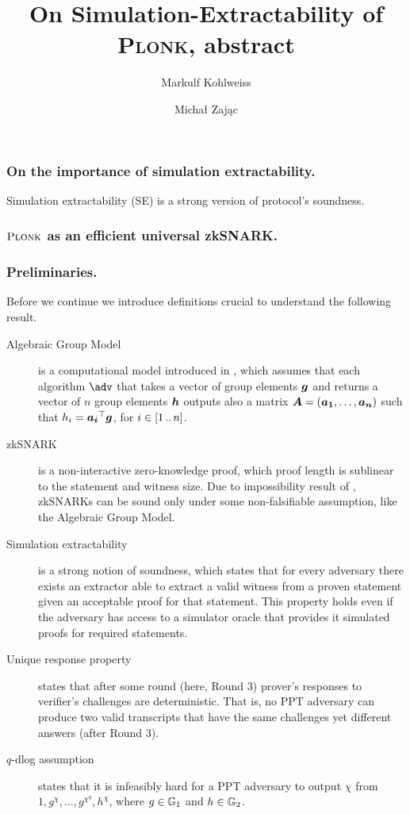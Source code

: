 \documentclass[runningheads,11pt]{llncs}
\title{On Simulation-Extractability of \textsc{Plonk}, abstract}
\author{Markulf Kohlweiss\inst{1,2} \and Michał Zając\inst{3}}
\institute{University of Edinburgh, Edinburgh, UK \and IOHK \\ \email{mkohlwei@inf.ed.ac.uk} \and Clearmatics, London UK \\ \email{m.p.zajac@gmail.com}}
\let\spvec\vec
\let\vec\accentvec
\let\vec\spvec
\def\vec#1{\mathchoice{\mbox{\boldmath$\displaystyle#1$}}
	{\mbox{\boldmath$\textstyle#1$}}
	{\mbox{\boldmath$\scriptstyle#1$}}
	{\mbox{\boldmath$\scriptscriptstyle#1$}}}
\begin{document}
	\maketitle
	
	\subsubsection*{On the importance of simulation extractability.}
	Simulation extractability (SE) is a strong version of protocol's soundness.
	
	\subsubsection*{$\textsc{Plonk}$ as an efficient universal zkSNARK.}
	
	\subsubsection*{Preliminaries.}
	Before we continue we introduce definitions crucial to understand the following result. 
	\begin{description}
		\item[Algebraic Group Model] is a computational model introduced in \cite{C:FucKilLos18}, which assumes that each algorithm $\adv$ that takes a vector of group elements $\vec{g}$ and returns a vector of $n$ group elements $\vec{h}$ outputs also a matrix $\vec{A} = (\vec{a_1}, \ldots, \vec{a_n})$ such that $h_i = \vec{a_i}^\top \vec{g}$, for $i \in [1 \, .. \, n]$.
		\item[zkSNARK] is a non-interactive zero-knowledge proof, which proof length is sublinear to the statement and witness size. Due to impossibility result of \cite{STOC:GenWic11}, zkSNARKs can be sound only under some non-falsifiable assumption, like the Algebraic Group Model.
		\item[Simulation extractability] is a strong notion of soundness, which states that for every adversary there exists an extractor able to extract a valid witness from a proven statement given an acceptable proof for that statement. This property holds even if the adversary has access to a simulator oracle that provides it simulated proofs for required statements. 
		\item[Unique response property] states that after some round (here, Round 3) prover's responses to verifier's challenges are deterministic. That is, no PPT adversary can produce two valid transcripts that have the same challenges yet different answers (after Round 3).
		\item[$q$-dlog assumption] states that it is infeasibly hard for a PPT adversary to output $\chi$ from $1, g^{\chi}, \ldots, g^{\chi^q}, h^{\chi}$, where $g \in \mathbb{G}_1$ and $h \in \mathbb{G}_2$.
	\end{description}
	
\end{document}
